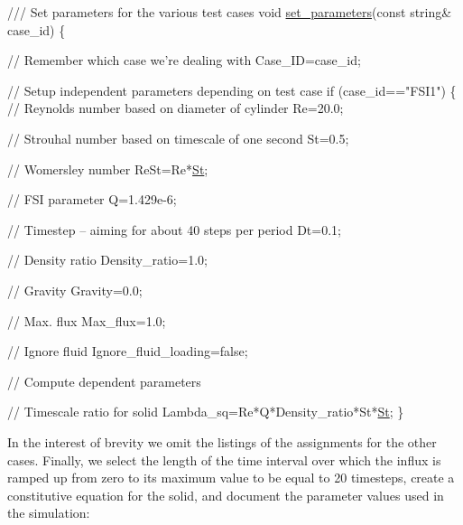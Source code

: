 \begin{DoxyCodeInclude}
 
\textcolor{comment}{}
\textcolor{comment}{ /// Set parameters for the various test cases}
\textcolor{comment}{} \textcolor{keywordtype}{void} \hyperlink{namespaceGlobal__Parameters_a8c333f9041cad78d5c0160a8e2c169f5}{set\_parameters}(\textcolor{keyword}{const} \textcolor{keywordtype}{string}& case\_id)
 \{

  \textcolor{comment}{// Remember which case we're dealing with}
  Case\_ID=case\_id;

  \textcolor{comment}{// Setup independent parameters depending on test case}
  \textcolor{keywordflow}{if} (case\_id==\textcolor{stringliteral}{"FSI1"})
   \{
    \textcolor{comment}{// Reynolds number based on diameter of cylinder}
    Re=20.0;

    \textcolor{comment}{// Strouhal number based on timescale of one second}
    St=0.5;

    \textcolor{comment}{// Womersley number}
    ReSt=Re*\hyperlink{namespaceGlobal__Parameters_af1af40a0df651e86bc1be273fafa98da}{St};

    \textcolor{comment}{// FSI parameter}
    Q=1.429e-6;
    
    \textcolor{comment}{// Timestep -- aiming for about 40 steps per period}
    Dt=0.1;

    \textcolor{comment}{// Density ratio}
    Density\_ratio=1.0;

    \textcolor{comment}{// Gravity}
    Gravity=0.0;
    
    \textcolor{comment}{// Max. flux}
    Max\_flux=1.0;

    \textcolor{comment}{// Ignore fluid}
    Ignore\_fluid\_loading=\textcolor{keyword}{false};
 
    \textcolor{comment}{// Compute dependent parameters}
    
    \textcolor{comment}{// Timescale ratio for solid }
    Lambda\_sq=Re*Q*Density\_ratio*St*\hyperlink{namespaceGlobal__Parameters_af1af40a0df651e86bc1be273fafa98da}{St};
  \}

\end{DoxyCodeInclude}


In the interest of brevity we omit the listings of the assignments for the other cases. Finally, we select the length of the time interval over which the influx is ramped up from zero to its maximum value to be equal to 20 timesteps, create a constitutive equation for the solid, and document the parameter values used in the simulation\+:


